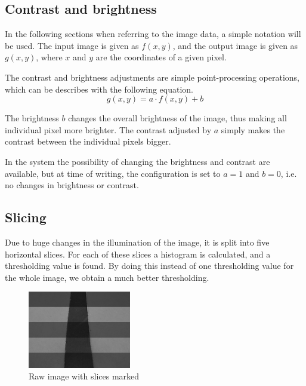 %
%
%
%
\subsection{Contrast and brightness}

In the following sections when referring to the image data, a simple notation will be used. The input image is given as $f(x,y)$, and the output image is given as $g(x,y)$, where $x$ and $y$ are the coordinates of a given pixel. 

The contrast and brightness adjustments are simple point-processing operations, which can be describes with the following equation.
\begin{equation}
	g(x,y) = a \cdot f(x,y) + b
\end{equation}

The brightness $b$ changes the overall brightness of the image, thus making all individual pixel more brighter. The contrast adjusted by $a$ simply makes the contrast between the individual pixels bigger.

In the system the possibility of changing the brightness and contrast are available, but at time of writing, the configuration is set to $a = 1$ and $b = 0$, i.e. no changes in brightness or contrast.


%
%
%
%
\subsection{Slicing}

Due to huge changes in the illumination of the image, it is split into five horizontal slices. For each of these slices a histogram is calculated, and a thresholding value is found. By doing this instead of one thresholding value for the whole image, we obtain a much better thresholding. 

\begin{figure}[!h]
	\centering
	\includegraphics[width=0.4\textwidth]{resources/img-line-straight-raw-sliced}
	\caption{Raw image with slices marked}
	\label{fig:camera_2}
\end{figure}



